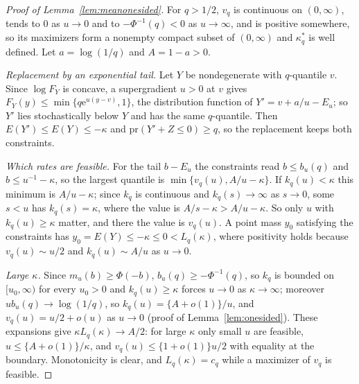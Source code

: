 \documentclass[11pt]{article}
\renewcommand{\_}{\usc\allowbreak}
\newcommand{\pr}{\mathrm{pr}}
\begin{document}
\begin{proof}[Proof of Lemma~\ref{lem:meanonesided}]
For $q > 1/2$, $v_q$ is continuous on $(0,\infty)$, tends to $0$ as $u \to 0$ and to $-\Phi^{-1}(q) < 0$ as $u \to \infty$, and is positive somewhere, so its maximizers form a nonempty compact subset of $(0,\infty)$ and $\kappa^*_q$ is well defined. Let $a = \log(1/q)$ and $A = 1 - a > 0$. 

\emph{Replacement by an exponential tail.} Let $Y$ be nondegenerate with $q$-quantile $v$. Since $\log F_Y$ is concave, a supergradient $u > 0$ at $v$ gives $F_Y(y) \le \min\{q\mathrm{e}^{u(y - v)}, 1\}$, the distribution function of $Y' = v + a/u - E_u$; so $Y'$ lies stochastically below $Y$ and has the same $q$-quantile. Then $E(Y') \le E(Y) \le -\kappa$ and $\pr(Y' + Z \le 0) \ge q$, so the replacement keeps both constraints.

\emph{Which rates are feasible.} For the tail $b - E_u$ the constraints read $b \le b_u(q)$ and $b \le u^{-1} - \kappa$, so the largest quantile is $\min\{v_q(u), A/u - \kappa\}$. If $k_q(u) < \kappa$ this minimum is $A/u - \kappa$; since $k_q$ is continuous and $k_q(s) \to \infty$ as $s \to 0$, some $s < u$ has $k_q(s) = \kappa$, where the value is $A/s - \kappa > A/u - \kappa$. So only $u$ with $k_q(u) \ge \kappa$ matter, and there the value is $v_q(u)$. A point mass $y_0$ satisfying the constraints has $y_0 = E(Y) \le -\kappa \le 0 < L_q(\kappa)$, where positivity holds because $v_q(u) \sim u/2$ and $k_q(u) \sim A/u$ as $u \to 0$.

\emph{Large $\kappa$.} Since $m_u(b) \ge \Phi(-b)$, $b_u(q) \ge -\Phi^{-1}(q)$, so $k_q$ is bounded on $[u_0, \infty)$ for every $u_0 > 0$ and $k_q(u) \ge \kappa$ forces $u \to 0$ as $\kappa \to \infty$; moreover $u b_u(q) \to \log(1/q)$, so $k_q(u) = \{A + o(1)\}/u$, and $v_q(u) = u/2 + o(u)$ as $u \to 0$ (proof of Lemma~\ref{lem:onesided}). These expansions give $\kappa L_q(\kappa) \to A/2$: for large $\kappa$ only small $u$ are feasible, $u \le \{A + o(1)\}/\kappa$, and $v_q(u) \le \{1 + o(1)\}u/2$ with equality at the boundary. Monotonicity is clear, and $L_q(\kappa) = c_q$ while a maximizer of $v_q$ is feasible.
\end{proof}
\end{document}

